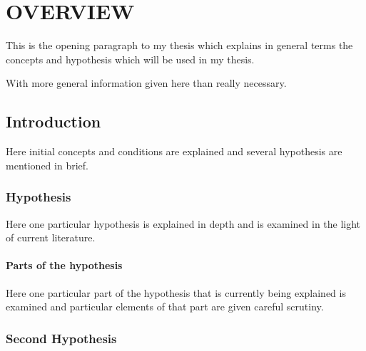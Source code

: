 \chapter{\MakeUppercase{Overview}}

This is the opening paragraph to my thesis which
explains in general terms the concepts and hypothesis
which will be used in my thesis.

With more general information given here than really
necessary.

\section{Introduction} \label{introSection}

Here initial concepts and conditions are explained and several hypothesis are mentioned in brief.

\subsection{Hypothesis}

Here one particular hypothesis is explained in depth and is examined in the light of current literature.

\subsubsection{Parts of the hypothesis}

Here one particular part of the hypothesis that is
currently being explained is examined and particular
elements of that part are given careful scrutiny.


\subsection{Second Hypothesis}


